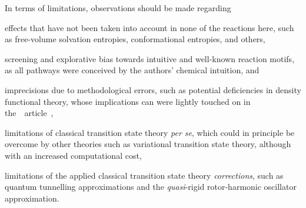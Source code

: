 
In terms of limitations, observations should be made regarding
\begin{itemize*}
	\item effects that have not been taken into account in none of the reactions here,
	      such as free-volume solvation entropies, conformational entropies, and others,
	\item screening and explorative bias towards intuitive and well-known reaction motifs,
	      as all pathways were conceived by the authors' chemical intuition, and
	\item imprecisions due to methodological errors, such as potential deficiencies in density functional theory,
	      whose implications can were lightly touched on in the~\overreact{}~article~\cite{Schneider_2022},
	\item limitations of classical transition state theory \emph{per se},
	      which could in principle be overcome by other theories such as variational transition state theory,
	      although with an increased computational cost,
	\item limitations of the applied classical transition state theory \emph{corrections},
	      such as quantum tunnelling approximations
	      and the \emph{quasi}-rigid rotor-harmonic oscillator approximation.
\end{itemize*}


